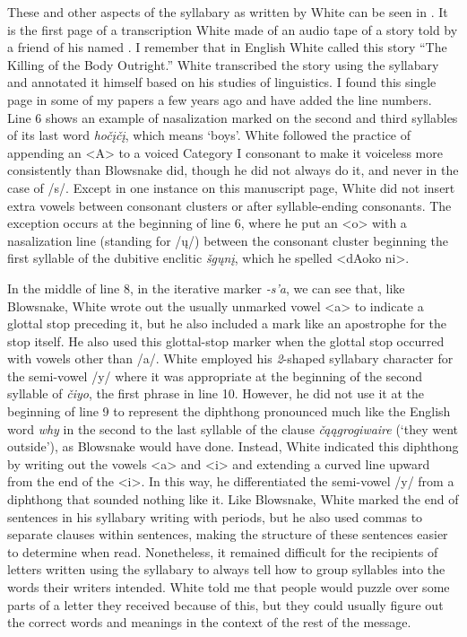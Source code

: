\documentclass[output=paper]{LSP/langsci}
\begin{document}
These and other aspects of the syllabary as written by White can be seen in . It is the first page of a transcription White made of an audio tape of a story told by a friend of his named . I remember that in English White called this story ``The Killing of the Body Outright.'' White transcribed the story using the syllabary and annotated it himself based on his studies of linguistics. I found this single page in some of my papers a few years ago and have added the line numbers. Line 6 shows an example of nasalization marked on the second and third syllables of its last word \emph{ho\v{c}\k{i}\v{c}\k{i}}, which means `boys'. White followed the practice of appending an <A> to a voiced Category I consonant to make it voiceless more consistently than Blowsnake did, though he did not always do it, and never in the case of /s/. Except in one instance on this manuscript page, White did not insert extra vowels between consonant clusters or after syllable-ending consonants. The exception occurs at the beginning of line 6, where he put an <o> with a nasalization line (standing for /\k{u}/) between the consonant cluster beginning the first syllable of the dubitive enclitic \emph{\v{s}g\k{u}n\k{i}}, which he spelled <dAoko ni>. 

In the middle of line 8, in the iterative marker \emph{-s'a}, we can see that, like Blow\-snake, White wrote out the usually unmarked vowel <a> to indicate a glottal stop preceding it, but he also included a mark like an apostrophe for the stop itself. He also used this glottal-stop marker when the glottal stop occurred with vowels other than /a/. White employed his \emph{2}-shaped syllabary character for the semi-vowel /y/ where it was appropriate at the beginning of the second syllable of \emph{\v{c}iyo}, the first phrase in line 10. However, he did not use it at the beginning of line 9 to represent the diphthong pronounced much like the English word \emph{why} in the second to the last syllable of the clause \emph{\v{c}\k{a}\k{a}grogiwaire} (`they went outside'), as Blowsnake would have done. Instead, White indicated this diphthong by writing out the vowels <a> and <i> and extending a curved line upward from the end of the <i>. In this way, he differentiated the semi-vowel /y/ from a diphthong that sounded nothing like it. Like Blowsnake, White marked the end of sentences in his syllabary writing with periods, but he also used commas to separate clauses within sentences, making the structure of these sentences easier to determine when read. Nonetheless, it remained difficult for the recipients of letters written using the syllabary to always tell how to group syllables into the words their writers intended. White told me that people would puzzle over some parts of a letter they received because of this, but they could usually figure out the correct words and meanings in the context of the rest of the message. 
\end{document}
